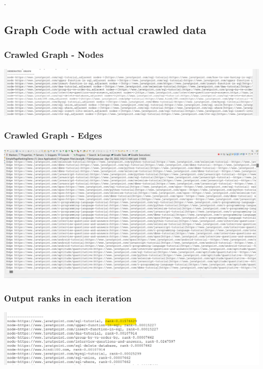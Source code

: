 \documentclass{article}
\begin{document}
\newpage
.
\newpage
\subsection{Graph Code with actual crawled data}

\subsubsection[Crawled Graph - Nodes]{Crawled Graph - Nodes}
\includegraphics[scale=0.06]{image1.png}

\subsubsection[Crawled Graph - Edges]{Crawled Graph - Edges}
\includegraphics[scale=0.06]{image2.png}

\subsubsection[Output ranks in each iteration]{Output ranks in each iteration}
\includegraphics[scale=0.1]{image3.png}
\end{document}
